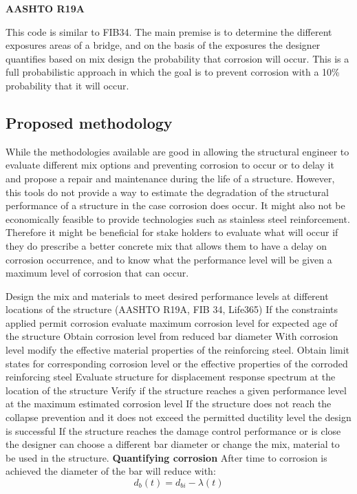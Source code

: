\textbf{AASHTO R19A}

This code is similar to FIB34. The main premise is to determine the different exposures areas of a bridge, and on the basis of the exposures the designer quantifies based on mix design the probability that corrosion will occur. This is a full probabilistic approach in which the goal is to prevent corrosion with a 10\% probability that it will occur.


\subsection{Proposed methodology}

While the methodologies available are good in allowing the structural engineer to evaluate different mix options and preventing corrosion to occur or to delay it and propose a repair and maintenance during the life of a structure.  However, this tools do not provide a way to estimate the degradation of the structural performance of a structure in the case corrosion does occur. It might also not be economically feasible to provide technologies such as stainless steel reinforcement. Therefore it might be beneficial for stake holders to evaluate what will occur if they do prescribe a better concrete mix that allows them to have a delay on corrosion occurrence, and to know what the performance level will be given a maximum level of corrosion that can occur.

Design the mix and materials to meet desired performance levels at different locations of the structure (AASHTO R19A, FIB 34, Life365)
If the constraints applied permit corrosion evaluate maximum corrosion level for expected age of the structure
Obtain corrosion level from reduced bar diameter
With corrosion level modify the  effective material properties of the reinforcing steel. 
Obtain limit states for corresponding corrosion level or the effective properties of the corroded reinforcing steel
Evaluate structure for displacement response spectrum at the location of the structure
Verify if the structure reaches a given performance level at the maximum estimated corrosion level
If the structure does not reach the collapse prevention and it does not exceed the permitted ductility level the design is successful
If the structure reaches the damage control performance or is close the designer can choose a different bar diameter or change the mix, material to be used in the structure.
\textbf{Quantifying corrosion}
After time to corrosion is achieved the diameter of the bar will reduce with:
\begin{equation}
    d_{b}(t)=d_{bi}-\lambda(t)
\end{equation}

